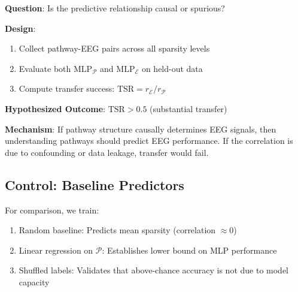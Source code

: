 \textbf{Question}: Is the predictive relationship causal or spurious?

\textbf{Design}:
\begin{enumerate}
    \item Collect pathway-EEG pairs across all sparsity levels
    \item Evaluate both $\text{MLP}_{\mathcal{P}}$ and $\text{MLP}_{\mathcal{E}}$ on held-out data
    \item Compute transfer success: $\text{TSR} = r_{\mathcal{E}} / r_{\mathcal{P}}$
\end{enumerate}

\textbf{Hypothesized Outcome}: $\text{TSR} > 0.5$ (substantial transfer)

\textbf{Mechanism}: If pathway structure causally determines EEG signals, then understanding pathways should predict EEG performance. If the correlation is due to confounding or data leakage, transfer would fail.

\subsection{Control: Baseline Predictors}

For comparison, we train:
\begin{enumerate}
    \item Random baseline: Predicts mean sparsity (correlation $\approx 0$)
    \item Linear regression on $\mathcal{P}$: Establishes lower bound on MLP performance
    \item Shuffled labels: Validates that above-chance accuracy is not due to model capacity
\end{enumerate}
